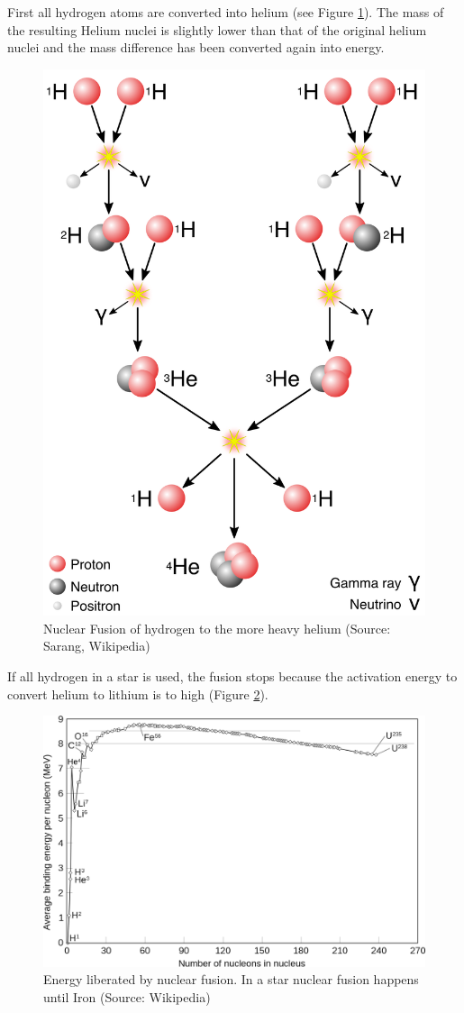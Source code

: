\documentclass[
  11pt,
]{book}
\begin{document}
First all hydrogen atoms are converted into helium (see Figure \ref{fig:nuclearFusion}). The mass of the resulting Helium nuclei is slightly lower than that of the original helium nuclei and the mass difference has been converted again into energy.

\begin{figure}

{\centering \includegraphics[width=0.5\linewidth]{./figs/fusion} 

}

\caption{Nuclear Fusion of hydrogen to the more heavy helium (Source: Sarang, Wikipedia)}\label{fig:nuclearFusion}
\end{figure}

If all hydrogen in a star is used, the fusion stops because the activation energy to convert helium to lithium is to high (Figure \ref{fig:fusionEnergy}).

\begin{figure}

{\centering \includegraphics[width=0.5\linewidth]{./figs/fusionEnergy} 

}

\caption{Energy liberated by nuclear fusion. In a star nuclear fusion happens until Iron (Source: Wikipedia)}\label{fig:fusionEnergy}
\end{figure}
\end{document}
